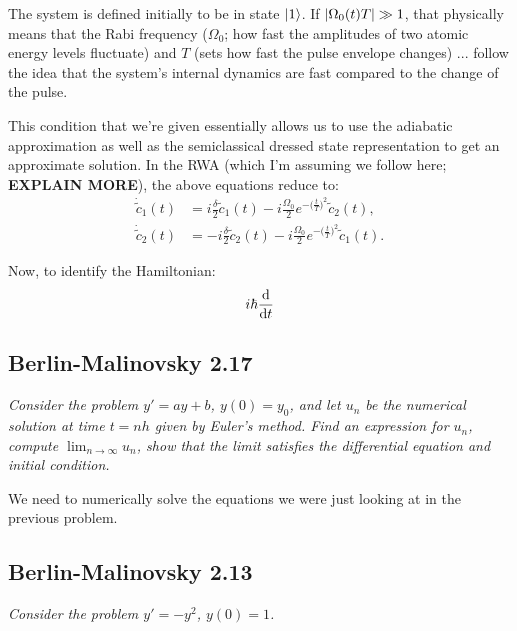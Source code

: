 The system is defined initially to be in state $\ket{1}$. If $\abs{\Omega_{0}(t)T} \gg 1$, that physically means that the Rabi frequency ($\Omega_{0}$; how fast the amplitudes of two atomic energy levels fluctuate) and $T$ (sets how fast the pulse envelope changes) ... follow the idea that the system's internal dynamics are fast compared to the change of the pulse.
\vspace{1em}

This condition that we're given essentially allows us to use the adiabatic approximation as well as the semiclassical dressed state representation to get an approximate solution. In the RWA (which I'm assuming we follow here; \textbf{EXPLAIN MORE}), the above equations reduce to:
\begin{align*}
  \dot\tilde c_{1}(t) &= i \frac{\delta}{2} \tilde c_{1}(t) - i \frac{\Omega_{0}}{2} e^{-\big(\frac{t}{T}\big)^{2}} \tilde c_{2}(t), \\
  \dot\tilde c_{2}(t) &= -i \frac{\delta}{2} \tilde c_{2}(t) - i \frac{\Omega_{0}}{2} e^{-\big(\frac{t}{T}\big)^{2}} \tilde c_{1}(t).
\end{align*}

Now, to identify the Hamiltonian:
\begin{equation*}
    i\hbar \dv{t} 
\end{equation*}


\subsection{Berlin-Malinovsky 2.17}
\textit{Consider the problem $y' = ay+b$, $y(0) = y_{0}$, and let $u_{n}$ be the numerical solution at time $t=nh$ given by Euler's method. Find an expression for $u_{n}$, compute $\lim_{n\to\infty}{u_{n}}$, show that the limit satisfies the differential equation and initial condition.}
\vspace{1em}

We need to numerically solve the equations we were just looking at in the previous problem.
\vspace{1em}

\subsection{Berlin-Malinovsky 2.13}
\textit{Consider the problem $y'=-y^{2}$, $y(0)=1$.}

